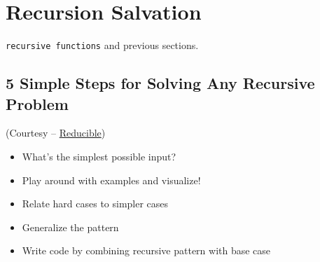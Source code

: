 \section{Recursion Salvation}
\begin{topics}
\verb!recursive functions! and previous sections.
\end{topics}
\subsection*{5 Simple Steps for Solving Any Recursive Problem}
(Courtesy -- \href{https://youtu.be/ngCos392W4w}{Reducible})
\begin{itemize}[noitemsep]
	\item What's the simplest possible input?
	\item Play around with examples and visualize!
	\item Relate hard cases to simpler cases
	\item Generalize the pattern
	\item Write code by combining recursive pattern with base case
\end{itemize}




